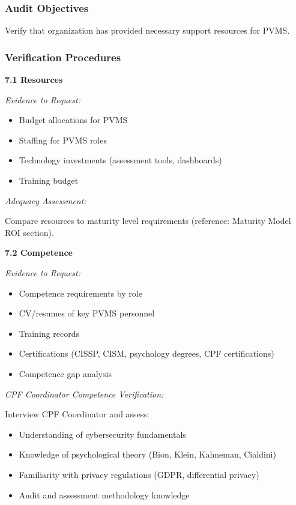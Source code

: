 \documentclass[11pt,a4paper]{article}
\begin{document}
\subsubsection{Audit Objectives}

Verify that organization has provided necessary support resources for PVMS.

\subsubsection{Verification Procedures}

\textbf{7.1 Resources}

\textit{Evidence to Request:}
\begin{itemize}
\item Budget allocations for PVMS
\item Staffing for PVMS roles
\item Technology investments (assessment tools, dashboards)
\item Training budget
\end{itemize}

\textit{Adequacy Assessment:}

Compare resources to maturity level requirements (reference: Maturity Model ROI section).

\textbf{7.2 Competence}

\textit{Evidence to Request:}
\begin{itemize}
\item Competence requirements by role
\item CV/resumes of key PVMS personnel
\item Training records
\item Certifications (CISSP, CISM, psychology degrees, CPF certifications)
\item Competence gap analysis
\end{itemize}

\textit{CPF Coordinator Competence Verification:}

Interview CPF Coordinator and assess:
\begin{itemize}
\item Understanding of cybersecurity fundamentals
\item Knowledge of psychological theory (Bion, Klein, Kahneman, Cialdini)
\item Familiarity with privacy regulations (GDPR, differential privacy)
\item Audit and assessment methodology knowledge
\end{itemize}
\end{document}

